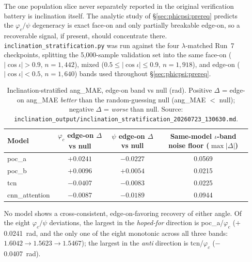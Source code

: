 The one population slice never separately reported in the original verification battery is inclination itself.
The analytic study of \S\ref{sec:phicpsi:prereq} predicts the $\varphi_c/\psi$ degeneracy is exact face-on and only partially breakable edge-on, so a recoverable signal, if present, should concentrate there.
\texttt{inclination\_stratification.py} was run against the four $\lambda$-matched Run~7 checkpoints, splitting the 5{,}000-sample validation set into the same face-on ($|\cos\iota| > 0.9$, $n=1{,}442$), mixed ($0.5 \le |\cos\iota| \le 0.9$, $n=1{,}918$), and edge-on ($|\cos\iota| < 0.5$, $n=1{,}640$) bands used throughout \S\ref{sec:phicpsi:prereq}.

\begin{table}[tbp]
    \centering
    \caption{Inclination-stratified ang\_MAE, edge-on band vs null (rad). Positive $\Delta$ = edge-on ang\_MAE \emph{better} than the random-guessing null (ang\_MAE $<$ null); negative $\Delta$ = \emph{worse} than null.
    Source: \texttt{inclination\_output/inclination\_stratification\_20260723\_130630.md}.}
    \label{tab:phicpsi:inclination}
    \small
    \begin{tabular}{@{}lccc@{}}
        \toprule
        Model & $\varphi_c$ edge-on $\Delta$ vs null & $\psi$ edge-on $\Delta$ vs null & Same-model $\iota$-band noise floor ($\max|\Delta|$) \\
        \midrule
        poc\_a         & $+0.0241$ & $-0.0227$ & 0.0569 \\
        poc\_b         & $+0.0096$ & $+0.0054$ & 0.0215 \\
        tcn            & $-0.0407$ & $-0.0083$ & 0.0225 \\
        cnn\_attention & $-0.0087$ & $-0.0189$ & 0.0944 \\
        \bottomrule
    \end{tabular}
\end{table}

No model shows a cross-consistent, edge-on-favoring recovery of either angle.
Of the eight $\varphi_c/\psi$ deviations, the largest in the \emph{hoped-for} direction is poc\_a/$\varphi_c$ ($+{}$\SI{0.0241}{\radian}, and the only one of the eight monotonic across all three bands: $1.6042 \to 1.5623 \to 1.5467$); the largest in the \emph{anti} direction is tcn/$\varphi_c$ ($-{}$\SI{0.0407}{\radian}).

